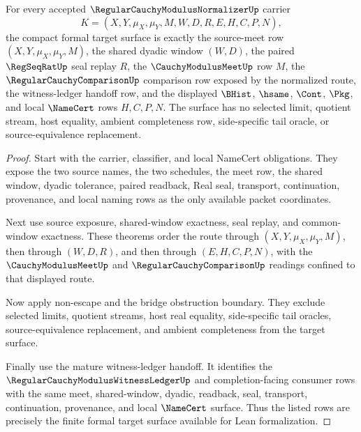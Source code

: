 \begin{theorem}
\label{thm:regular-cauchy-modulus-normalizer-formal-target-surface}
For every accepted $\RegularCauchyModulusNormalizerUp$ carrier
$$
K=(X,Y,\mu_X,\mu_Y,M,W,D,R,E,H,C,P,N),
$$
the compact formal target surface is exactly the source-meet row
$(X,Y,\mu_X,\mu_Y,M)$, the shared dyadic window $(W,D)$, the paired
$\RegSeqRatUp$ seal replay $R$, the $\CauchyModulusMeetUp$ row $M$, the
$\RegularCauchyComparisonUp$ comparison row exposed by the normalized route,
the witness-ledger handoff row, and the displayed $\BHist$, $\hsame$, $\Cont$,
$\Pkg$, and local $\NameCert$ rows $H,C,P,N$. The surface has no selected
limit, quotient stream, host equality, ambient completeness row, side-specific
tail oracle, or source-equivalence replacement.
\end{theorem}
\begin{proof}
Start with the carrier, classifier, and local NameCert obligations. They expose
the two source names, the two schedules, the meet row, the shared window,
dyadic tolerance, paired readback, Real seal, transport, continuation,
provenance, and local naming rows as the only available packet coordinates.

Next use source exposure, shared-window exactness, seal replay, and
common-window exactness. These theorems order the route through
$(X,Y,\mu_X,\mu_Y,M)$, then through $(W,D,R)$, and then through
$(E,H,C,P,N)$, with the $\CauchyModulusMeetUp$ and
$\RegularCauchyComparisonUp$ readings confined to that displayed route.

Now apply non-escape and the bridge obstruction boundary. They exclude selected
limits, quotient streams, host real equality, side-specific tail oracles,
source-equivalence replacement, and ambient completeness from the target
surface.

Finally use the mature witness-ledger handoff. It identifies the
$\RegularCauchyModulusWitnessLedgerUp$ and completion-facing consumer rows with
the same meet, shared-window, dyadic, readback, seal, transport, continuation,
provenance, and local $\NameCert$ surface. Thus the listed rows are precisely
the finite formal target surface available for Lean formalization.
\end{proof}

